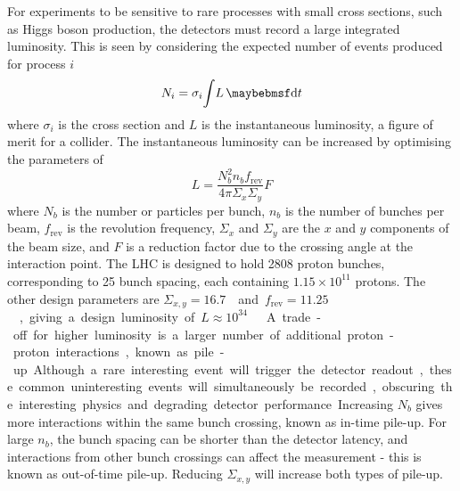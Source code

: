 For experiments to be sensitive to rare processes with small cross sections, such as Higgs 
boson production, the detectors must record a large integrated luminosity. This is seen by 
considering the expected number of events produced for process $i$
\begin{equation}
	N_i = \sigma_i \! \int \! L \, \diff t
	\label{eq:event_rate}
\end{equation}
where $\sigma_i$ is the cross section and $L$ is the instantaneous luminosity, a figure of 
merit for a collider. The instantaneous luminosity can be increased by optimising the
parameters of
\begin{equation}
	L = \frac{N_b^2 n_b f_{\text{rev}}}{4\pi \varSigma_x \varSigma_y} F
	\label{eq:lumi_beam}
\end{equation}
where $N_b$ is the number or particles per bunch, $n_b$ is the number of bunches per beam, 
$f_{\text{rev}}$ is the revolution frequency, $\varSigma_x$ and $\varSigma_y$ are the $x$ 
and $y$ components of the beam size, and $F$ is a reduction factor due to the crossing 
angle at the interaction point. The \ac{LHC} is designed to hold 2808 proton bunches, 
corresponding to \unit{25}{\nano\second} bunch spacing, each containing $1.15\times10^{11}$
protons. The other design parameters are \unit{$\varSigma_{x,y} = 16.7$}{\micro\metre} 
and \unit{$f_{\text{rev}} = 11.25$}{\kHz}, giving a design luminosity of 
\unit{$L \approx 10^{34}$}{\lumiunits} \cite{LHC}.

A trade-off for higher luminosity is a larger number of additional proton-proton 
interactions, known as pile-up. Although a rare interesting event will trigger the 
detector readout, these common uninteresting events will simultaneously be recorded, 
obscuring the interesting physics and degrading detector performance. Increasing $N_b$ 
gives more interactions within the same bunch crossing, known as in-time pile-up. For 
large $n_b$, the bunch spacing can be shorter than the detector latency, and interactions 
from other bunch crossings can affect the measurement - this is known as out-of-time 
pile-up. Reducing $\varSigma_{x,y}$ will increase both types of pile-up.
